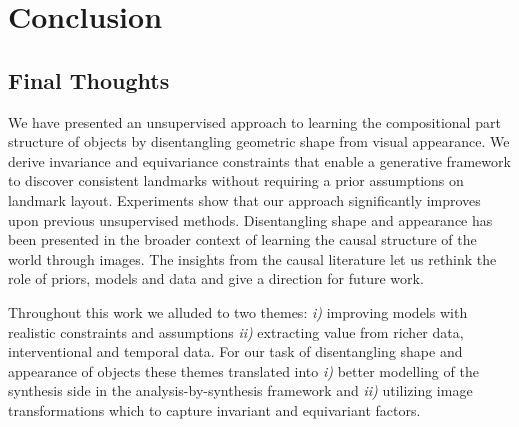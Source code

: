 

\chapter{Conclusion}

\section{Final Thoughts}\label{sec:finalthoughts}


	We have presented an unsupervised approach to learning the compositional part structure of objects by disentangling geometric shape from visual appearance. We derive invariance and equivariance constraints that enable a generative framework to discover consistent landmarks without requiring a prior assumptions on landmark layout. Experiments show that our approach significantly improves upon previous unsupervised methods.
	Disentangling shape and appearance has been presented in the broader context of learning the causal structure of the world through images. The insights from the causal literature let us rethink the role of priors, models and data and give a direction for future work.

	Throughout this work we alluded to two themes: \emph{i)} improving models with realistic constraints and assumptions \emph{ii)} extracting value from richer data, \ie interventional and temporal data.
	For our task of disentangling shape and appearance of objects these themes translated into \emph{i)} better modelling of the synthesis side in the analysis-by-synthesis framework and \emph{ii)} utilizing image transformations \wrt which to capture invariant and equivariant factors.


